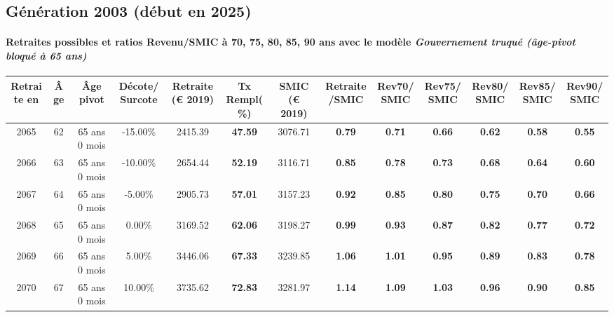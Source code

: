 \newpage 
 
\subsection{Génération 2003 (début en 2025)} 

\paragraph{Retraites possibles et ratios Revenu/SMIC à 70, 75, 80, 85, 90 ans avec le modèle \emph{Gouvernement truqué (âge-pivot bloqué à 65 ans)}}  
 
{ \scriptsize \begin{center} 
\begin{tabular}[htb]{|c|c||c|c||c|c||c||c|c|c|c|c|c|} 
\hline 
 Retraite en &  Âge &  Âge pivot &  Décote/Surcote &  Retraite (\euro{} 2019) &  Tx Rempl(\%) &  SMIC (\euro{} 2019) &  Retraite/SMIC &  Rev70/SMIC &  Rev75/SMIC &  Rev80/SMIC &  Rev85/SMIC &  Rev90/SMIC \\ 
\hline \hline 
 2065 &  62 &  65 ans 0 mois &  -15.00\% &  2415.39 &  {\bf 47.59} &  3076.71 &  {\bf {\color{red} 0.79}} &  {\bf {\color{red} 0.71}} &  {\bf {\color{red} 0.66}} &  {\bf {\color{red} 0.62}} &  {\bf {\color{red} 0.58}} &  {\bf {\color{red} 0.55}} \\ 
\hline 
 2066 &  63 &  65 ans 0 mois &  -10.00\% &  2654.44 &  {\bf 52.19} &  3116.71 &  {\bf {\color{red} 0.85}} &  {\bf {\color{red} 0.78}} &  {\bf {\color{red} 0.73}} &  {\bf {\color{red} 0.68}} &  {\bf {\color{red} 0.64}} &  {\bf {\color{red} 0.60}} \\ 
\hline 
 2067 &  64 &  65 ans 0 mois &  -5.00\% &  2905.73 &  {\bf 57.01} &  3157.23 &  {\bf {\color{red} 0.92}} &  {\bf {\color{red} 0.85}} &  {\bf {\color{red} 0.80}} &  {\bf {\color{red} 0.75}} &  {\bf {\color{red} 0.70}} &  {\bf {\color{red} 0.66}} \\ 
\hline 
 2068 &  65 &  65 ans 0 mois &  0.00\% &  3169.52 &  {\bf 62.06} &  3198.27 &  {\bf {\color{red} 0.99}} &  {\bf {\color{red} 0.93}} &  {\bf {\color{red} 0.87}} &  {\bf {\color{red} 0.82}} &  {\bf {\color{red} 0.77}} &  {\bf {\color{red} 0.72}} \\ 
\hline 
 2069 &  66 &  65 ans 0 mois &  5.00\% &  3446.06 &  {\bf 67.33} &  3239.85 &  {\bf 1.06} &  {\bf 1.01} &  {\bf {\color{red} 0.95}} &  {\bf {\color{red} 0.89}} &  {\bf {\color{red} 0.83}} &  {\bf {\color{red} 0.78}} \\ 
\hline 
 2070 &  67 &  65 ans 0 mois &  10.00\% &  3735.62 &  {\bf 72.83} &  3281.97 &  {\bf 1.14} &  {\bf 1.09} &  {\bf 1.03} &  {\bf {\color{red} 0.96}} &  {\bf {\color{red} 0.90}} &  {\bf {\color{red} 0.85}} \\ 
\hline 
\hline 
\end{tabular} 
\end{center} } 
